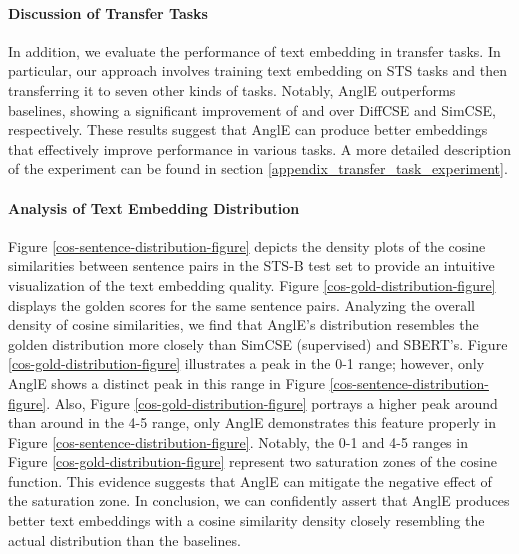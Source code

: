 \documentclass{article} \usepackage{iclr2024_conference,times}
\begin{document}
\paragraph{Discussion of Transfer Tasks}
\label{sec-transfer tasks}
In addition, we evaluate the performance of text embedding in transfer tasks. In particular, our approach involves training text embedding on STS tasks and then transferring it to seven other kinds of tasks. Notably, AnglE outperforms baselines, showing a significant improvement of  and  over DiffCSE and SimCSE, respectively. These results suggest that AnglE can produce better embeddings that effectively improve performance in various tasks. A more detailed description of the experiment can be found in section \ref{appendix_transfer_task_experiment}.


\paragraph{Analysis of Text Embedding Distribution}
Figure \ref{cos-sentence-distribution-figure} depicts the density plots of the cosine similarities between sentence pairs in the STS-B test set to provide an intuitive visualization of the text embedding quality. Figure \ref{cos-gold-distribution-figure} displays the golden scores for the same sentence pairs. Analyzing the overall density of cosine similarities, we find that AnglE's distribution resembles the golden distribution more closely than SimCSE (supervised) and SBERT's. Figure \ref{cos-gold-distribution-figure} illustrates a peak in the 0-1 range; however, only AnglE shows a distinct peak in this range in Figure \ref{cos-sentence-distribution-figure}. 
Also, Figure \ref{cos-gold-distribution-figure} portrays a higher peak around  than around  in the 4-5 range, only AnglE demonstrates this feature properly in Figure \ref{cos-sentence-distribution-figure}. 
Notably, the 0-1 and 4-5 ranges in Figure \ref{cos-gold-distribution-figure} represent two saturation zones of the cosine function. This evidence suggests that AnglE can mitigate the negative effect of the saturation zone. In conclusion, we can confidently assert that AnglE produces better text embeddings with a cosine similarity density closely resembling the actual distribution than the baselines.
\end{document}
